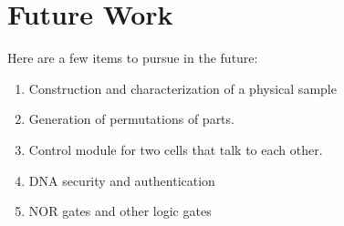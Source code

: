 \documentclass{article}
\begin{document}
\section{Future Work}
Here are a few items to pursue in the future:
\begin{enumerate}
\item Construction and characterization of a physical sample
\item Generation of permutations of parts. 
\item Control module for two cells that talk to each other.
\item DNA security and authentication
\item NOR gates and other logic gates
\end{enumerate}
\end{document}
